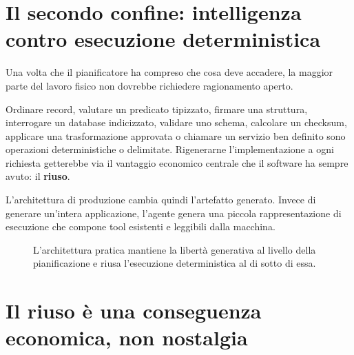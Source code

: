 \documentclass[10pt,oneside,openany]{book}
\begin{document}
\section{Il secondo confine: intelligenza contro esecuzione deterministica}

Una volta che il pianificatore ha compreso che cosa deve accadere, la maggior parte del lavoro fisico non dovrebbe richiedere ragionamento aperto.

Ordinare record, valutare un predicato tipizzato, firmare una struttura, interrogare un database indicizzato, validare uno schema, calcolare un checksum, applicare una trasformazione approvata o chiamare un servizio ben definito sono operazioni deterministiche o delimitate. Rigenerarne l'implementazione a ogni richiesta getterebbe via il vantaggio economico centrale che il software ha sempre avuto: il \textbf{riuso}.

L'architettura di produzione cambia quindi l'artefatto generato. Invece di generare un'intera applicazione, l'agente genera una piccola rappresentazione di esecuzione che compone tool esistenti e leggibili dalla macchina.

\begin{figure}[ht]
\centering
{}
\caption{L'architettura pratica mantiene la libertà generativa al livello della pianificazione e riusa l'esecuzione deterministica al di sotto di essa.}
\end{figure}

\section{Il riuso è una conseguenza economica, non nostalgia}
\end{document}
